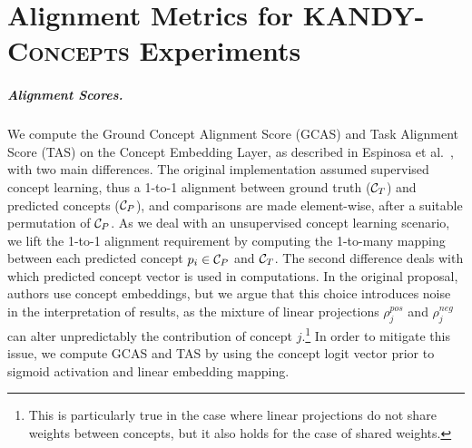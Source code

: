\chapter{Alignment Metrics for \textsc{KANDY-Concepts} Experiments}\label{app:kandycemmetrics}
\paragraph{Alignment Scores.} We compute the {\sc\small Ground Concept Alignment Score} (GCAS) and {\sc\small Task Alignment Score} (TAS) on the Concept Embedding Layer, as described in Espinosa et al.~\cite{espinosa2022concept}, with two main differences.
The original implementation assumed supervised concept learning, thus a 1-to-1 alignment between ground truth (${\mathcal{C}}_T$) and predicted concepts (${\mathcal{C}}_P$), and comparisons are made element-wise, after a suitable permutation of ${\mathcal{C}}_P$.
As we deal with an unsupervised concept learning scenario, we lift the 1-to-1 alignment requirement by computing the 1-to-many mapping between each predicted concept $p_i \in {\mathcal{C}}_P$ and ${\mathcal{C}}_T$.
%
The second difference deals with which predicted concept vector is used in computations. In the original proposal, authors use concept embeddings, but we argue that this choice introduces noise in the interpretation of results, as the mixture of linear projections $\rho^{pos}_j$ and $\rho^{neg}_j$ can alter unpredictably the contribution of concept $j$.\footnote{This is particularly true in the case where linear projections do not share weights between concepts, but it also holds for the case of shared weights.} %
In order to mitigate this issue, we compute GCAS and TAS by using the concept logit vector prior to sigmoid activation and linear embedding mapping.

